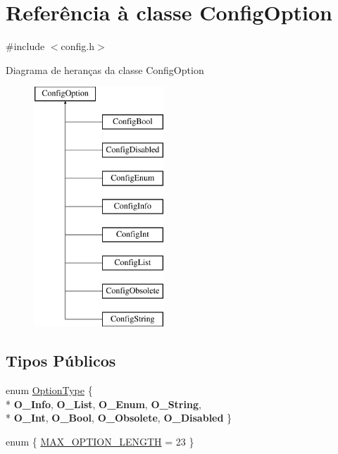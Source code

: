 \hypertarget{class_config_option}{\section{Referência à classe Config\-Option}
\label{class_config_option}
}


{\ttfamily \#include $<$config.\-h$>$}

Diagrama de heranças da classe Config\-Option\begin{figure}[H]
\begin{center}
\leavevmode
\includegraphics[height=9.000000cm]{class_config_option}
\end{center}
\end{figure}
\subsection*{Tipos Públicos}
\begin{DoxyCompactItemize}
\item 
enum \hyperlink{class_config_option_a976bded296a67e09242af85291a639d6}{Option\-Type} \{ \\*
{\bfseries O\-\_\-\-Info}, 
{\bfseries O\-\_\-\-List}, 
{\bfseries O\-\_\-\-Enum}, 
{\bfseries O\-\_\-\-String}, 
\\*
{\bfseries O\-\_\-\-Int}, 
{\bfseries O\-\_\-\-Bool}, 
{\bfseries O\-\_\-\-Obsolete}, 
{\bfseries O\-\_\-\-Disabled}
 \}
\item 
enum \{ \hyperlink{class_config_option_a61dadd085c1777f559549e05962b2c9eaf9043652ab6c0a36c22f6bdea78d1d5a}{M\-A\-X\-\_\-\-O\-P\-T\-I\-O\-N\-\_\-\-L\-E\-N\-G\-T\-H} = 23
 \}
\end{DoxyCompactItemize}
